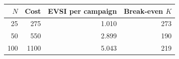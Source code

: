 \begin{tabular}{rrrr}
\toprule
$N$ & Cost & EVSI per campaign & Break-even $K$\\
\midrule
25 & 275 & 1.010 & 273\\
50 & 550 & 2.899 & 190\\
100 & 1100 & 5.043 & 219\\
\bottomrule
\end{tabular}
